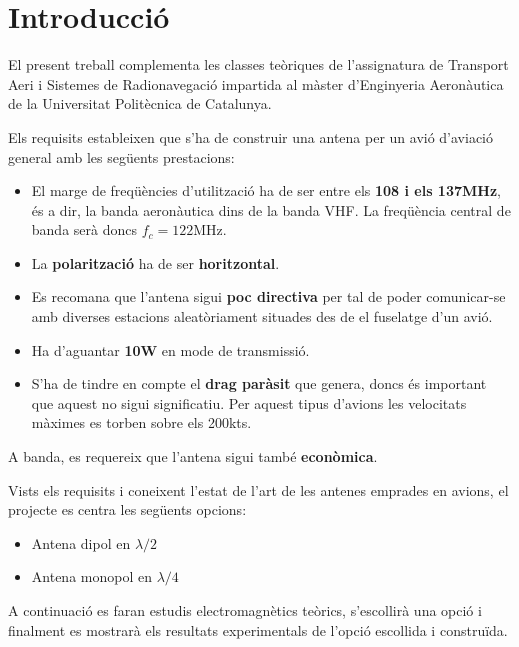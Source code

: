 \chapter{Introducció}
El present treball complementa les classes teòriques de l'assignatura de Transport Aeri i Sistemes de Radionavegació impartida al màster d'Enginyeria Aeronàutica de la Universitat Politècnica de Catalunya.

Els requisits estableixen que s'ha de construir una antena per un avió d'aviació general amb les següents prestacions:
\begin{itemize}
\item El marge de freqüències d'utilització ha de ser entre els \textbf{108 i els 137MHz}, és a dir, la banda aeronàutica dins de la banda VHF. La freqüència central de banda serà doncs $f_c = 122$MHz.
\item La \textbf{polarització} ha de ser \textbf{horitzontal}.
\item Es recomana que l'antena sigui \textbf{poc directiva} per tal de poder comunicar-se amb diverses estacions aleatòriament situades des de el fuselatge d'un avió.
\item Ha d'aguantar \textbf{10W} en mode de transmissió.
\item S'ha de tindre en compte el \textbf{drag paràsit} que genera, doncs és important que aquest no sigui significatiu. Per aquest tipus d'avions les velocitats màximes es torben sobre els 200kts.
\end{itemize}
A banda, es requereix que l'antena sigui també \textbf{econòmica}.

Vists els requisits i coneixent l'estat de l'art de les antenes emprades en avions, el projecte es centra les següents opcions:
\begin{itemize}
\item Antena dipol en $\lambda/2$
\item Antena monopol en $\lambda/4$
\end{itemize}

A continuació es faran estudis electromagnètics teòrics, s'escollirà una opció i finalment es mostrarà els resultats experimentals de l'opció escollida i construïda.